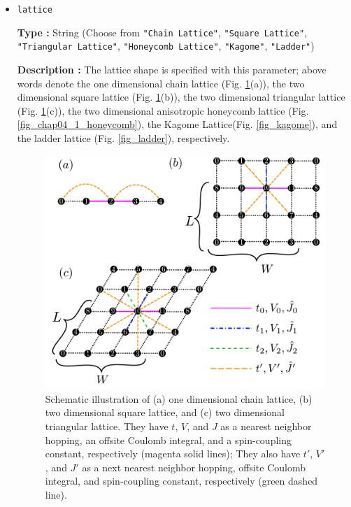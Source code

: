 \begin{itemize}
\item \verb|lattice|

{\bf Type :} String (Choose from \verb|"Chain Lattice"|, \verb|"Square Lattice"|, 
\verb|"Triangular Lattice"|, \verb|"Honeycomb Lattice"|, \verb|"Kagome"|, \verb|"Ladder"|)

{\bf Description :} The lattice shape is specified with this parameter;
above words denote
the one dimensional chain lattice (Fig. \ref{fig_chap04_1_lattice}(a)), 
the two dimensional square lattice (Fig. \ref{fig_chap04_1_lattice}(b)),
the two dimensional triangular lattice (Fig. \ref{fig_chap04_1_lattice}(c)),
the two dimensional anisotropic honeycomb lattice (Fig. \ref{fig_chap04_1_honeycomb}),
the Kagome Lattice(Fig. \ref{fig_kagome}),
and
the ladder lattice (Fig. \ref{fig_ladder}),
respectively.

\begin{figure}[!tbhp]
  \begin{center}
    \includegraphics[width=15cm]{../figs/chap04_1_lattice.pdf}
    \caption{Schematic illustration of
      (a) one dimensional chain lattice, 
      (b) two dimensional square lattice, and 
      (c) two dimensional triangular lattice.
      They have $t$, $V$, and $J$ as a nearest neighbor hopping, an offsite Coulomb integral, 
      and a spin-coupling constant, respectively (magenta solid lines);
      They also have $t'$, $V'$, and $J'$ as a next nearest neighbor hopping, offsite Coulomb integral, 
      and spin-coupling constant, respectively (green dashed line).
    }
    \label{fig_chap04_1_lattice}
  \end{center}
\end{figure}


\end{itemize}
